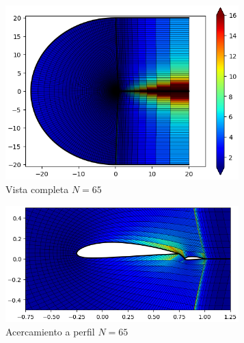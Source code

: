 \documentclass[letterpaper, openright, 12pt]{book}
\begin{document}
    \begin{figure}[htbp!]
        \centering
        \begin{subfigure}[c]{0.48\textwidth}
            \includegraphics[keepaspectratio, width=0.99\textwidth]
                {./img/naca4415_c_flap_n_65_aspect_far}
            \caption{Vista completa $N = 65$}
            \label{fig:naca4415_c_flap_n_65_aspect_far}
        \end{subfigure}
        \hfill
        \begin{subfigure}[c]{0.48\textwidth}
            \includegraphics[keepaspectratio, width=0.99\textwidth]
                {./img/naca4415_c_flap_n_65_aspect_close}
            \caption{Acercamiento a perfil $N = 65$}
            \label{fig:naca4415_c_flap_n_65_aspect_close}
        \end{subfigure}
        \begin{subfigure}[c]{0.48\textwidth}

\end{subfigure}
\end{figure}
\end{document}
